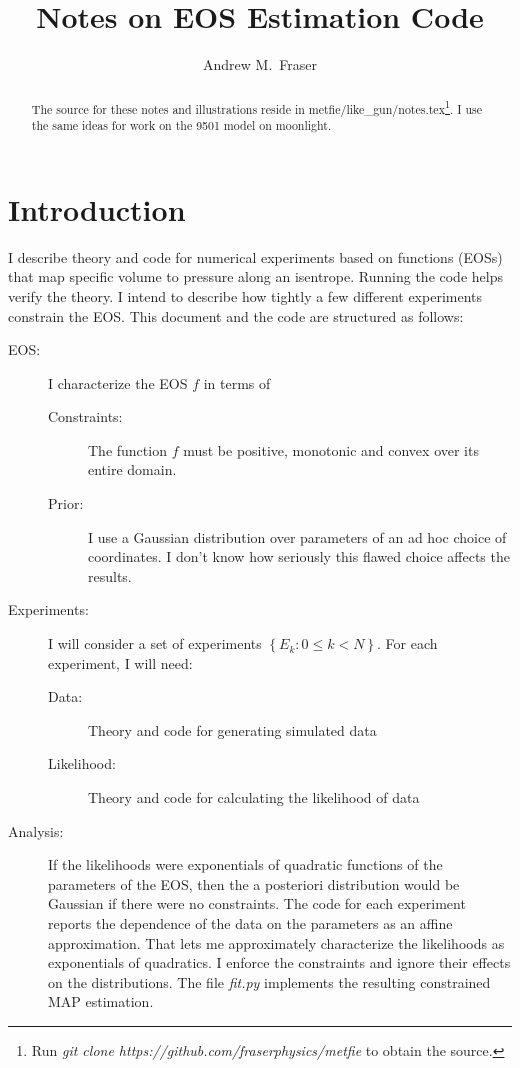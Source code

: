 \documentclass[11pt]{article}
\title{Notes on EOS Estimation Code}
\author{Andrew M.\ Fraser}
\begin{document}
\maketitle
\begin{abstract}
  The source for these notes and illustrations reside in
  metfie/like\_gun/notes.tex\footnote{Run \emph{git clone
      https://github.com/fraserphysics/metfie} to obtain the source.}.
  I use the same ideas for work on the 9501 model on moonlight.
\end{abstract}

\section{Introduction}
\label{sec:introduction}

I describe theory and code for numerical experiments based on functions
(EOSs) that map specific volume to pressure along an isentrope.
Running the code helps verify the theory.  I intend to describe how
tightly a few different experiments constrain the EOS.  This document
and the code are structured as follows:
\begin{description}
\item[EOS:] I characterize the EOS $f$ in terms of
  \begin{description}
  \item[Constraints:] The function $f$ must be positive, monotonic and
    convex over its entire domain.
  \item[Prior:] I use a Gaussian distribution over parameters of an ad
    hoc choice of coordinates.  I don't know how seriously this flawed
    choice affects the results.
  \end{description}
\item[Experiments:] I will consider a set of experiments
  $\left\{ E_k: 0 \leq k < N \right\}$.  For each experiment, I will
  need:
  \begin{description}
  \item[Data:] Theory and code for generating simulated data
  \item[Likelihood:] Theory and code for calculating the likelihood of
    data
  \end{description}
\item[Analysis:] If the likelihoods were exponentials of quadratic
  functions of the parameters of the EOS, then the a posteriori
  distribution would be Gaussian if there were no constraints.  The
  code for each experiment reports the dependence of the data on the
  parameters as an affine approximation.  That lets me approximately
  characterize the likelihoods as exponentials of quadratics.  I
  enforce the constraints and ignore their effects on the
  distributions.  The file \emph{fit.py} implements the resulting
  constrained MAP estimation.
\end{description}
\end{document}

